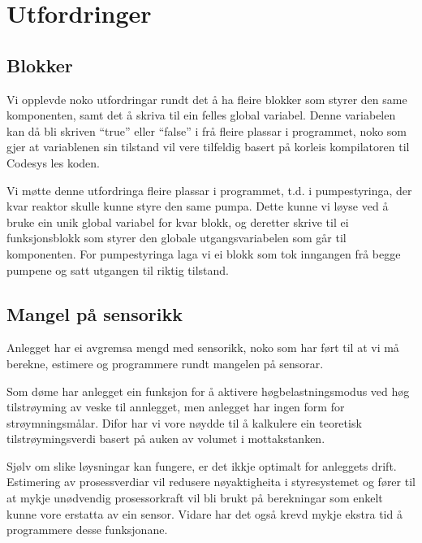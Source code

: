 \section{Utfordringer}
\thispagestyle{fancy}

\subsection{Blokker}
Vi opplevde noko utfordringar rundt det å ha fleire blokker som styrer den same komponenten, samt det å  
skriva til ein felles global variabel.
Denne variabelen kan då bli skriven ``true'' eller ``false'' i frå fleire plassar i programmet, noko som gjer at 
variablenen sin tilstand vil vere tilfeldig basert på korleis kompilatoren til \gls{Codesys} les koden.

Vi møtte denne utfordringa fleire plassar i programmet, t.d. i pumpestyringa,
der kvar reaktor skulle kunne styre den same pumpa.
Dette kunne vi løyse ved å bruke ein unik global variabel for kvar blokk, 
og deretter skrive til ei funksjonsblokk som styrer den globale utgangsvariabelen som går til komponenten.\newline
For pumpestyringa laga vi ei blokk som tok inngangen frå begge pumpene og satt utgangen til riktig tilstand.  

\subsection{Mangel på sensorikk}

Anlegget har ei avgremsa mengd med sensorikk, 
noko som har ført til at vi må berekne, estimere og programmere rundt mangelen på sensorar.

Som døme har anlegget ein funksjon for å aktivere
høgbelastningsmodus ved høg tilstrøyming av veske til annlegget, 
men anlegget har ingen form for strøymningsmålar.\newline
Difor har vi vore nøydde til å kalkulere ein teoretisk tilstrøymingsverdi basert på auken av volumet i mottakstanken.

Sjølv om slike løysningar kan fungere, er det ikkje optimalt for anleggets drift.
Estimering av prosessverdiar vil redusere nøyaktigheita i styresystemet og fører til at
mykje unødvendig prosessorkraft vil bli brukt på berekningar som enkelt kunne vore erstatta av ein sensor.\newline
Vidare har det også krevd mykje ekstra tid å programmere desse funksjonane.





